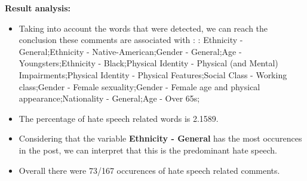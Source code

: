 \documentclass[11pt]{article}
\begin{document}
\textbf{\Large Result analysis:}

\begin{itemize}\item Taking into account the words that were detected, we can reach the conclusion these comments are associated with : : Ethnicity - General;Ethnicity - Native-American;Gender - General;Age - Youngsters;Ethnicity - Black;Physical Identity - Physical (and Mental) Impairments;Physical Identity - Physical Features;Social Class - Working class;Gender - Female sexuality;Gender - Female age and physical appearance;Nationality - General;Age - Over 65s;%

\item The percentage of hate speech related words is 2.1589.

\item Considering that the variable \textbf{Ethnicity - General} has the most occurences in the post, we can interpret that this is the predominant hate speech.

\item Overall there were 73/167 occurences of hate speech related comments.\end{itemize}
\end{document}
